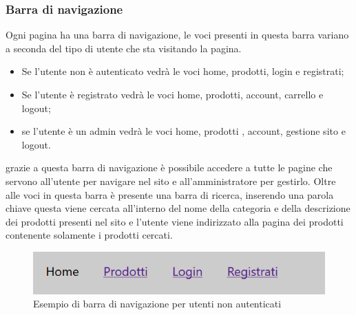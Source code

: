 \subsubsection{Barra di navigazione} 
Ogni pagina ha una barra di navigazione, le voci presenti in questa barra variano a seconda del tipo di utente che sta visitando la pagina.
\begin{itemize}
\item Se l'utente non è autenticato vedrà le voci home, prodotti, login e registrati;
\item Se l'utente è registrato vedrà le voci home, prodotti, account, carrello e logout;
\item se l'utente è un admin vedrà le voci home, prodotti , account, gestione sito e logout.
\end{itemize}
grazie a questa barra di navigazione è possibile accedere a tutte le pagine che servono all'utente per navigare nel sito e all'amministratore per gestirlo. Oltre alle voci in questa barra è presente una barra di ricerca, inserendo una parola chiave questa viene cercata all'interno del nome della categoria e della descrizione dei prodotti presenti nel sito e l'utente viene indirizzato alla pagina dei prodotti contenente solamente i prodotti cercati.
\begin{figure}[h]
	\label{navbarz} 
	\centering 
	\includegraphics[width=1\textwidth]{immagini/navbar.png}
	\caption{Esempio di barra di navigazione per utenti non autenticati} 
\end{figure}

